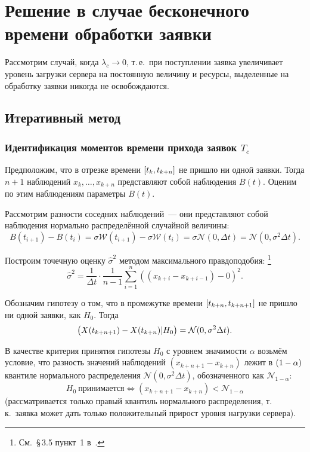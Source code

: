 \documentclass[a4paper,10pt]{article}
\begin{document}
\section{Решение в случае бесконечного времени обработки заявки}
Рассмотрим случай, когда $\lambda_c \rightarrow 0$, 
т.\,е.~при поступлении заявка увеличивает уровень загрузки 
сервера на постоянную величину и ресурсы, выделенные на обработку заявки
никогда не освобождаются.

\subsection{Итеративный метод}
\subsubsection{Идентификация моментов времени прихода заявок $T_c$}%
\label{lc0-iter-Tc}
Предположим, что в отрезке времени $\sbr{t_k, t_{k+n}}$ 
не пришло ни одной заявки.
Тогда $n + 1$ наблюдений $x_k,\ldots,x_{k+n}$ представляют собой наблюдения
$B(t)$.
Оценим по этим наблюдениям параметры $B(t)$.

Рассмотрим разности соседних наблюдений~--- они представляют собой наблюдения 
нормально распределённой случайной величины:
$$B(t_{i+1}) - B(t_i) = 
    \sigma \mathcal{W}(t_{i+1}) - \sigma \mathcal{W}(t_i) = 
    \sigma \mathcal{N}(0, \Delta t) = 
    \mathcal{N}(0, \sigma^2 \Delta t).$$

Построим точечную оценку $\widehat{\sigma}^2$ 
методом максимального правдоподобия:%
\footnote{См.~\S\,3.5 пункт~1 в~\cite{ivchmed2010matstat}.}
%
$$\widehat{\sigma}^2 = 
    \frac{1}{\Delta t}\cdot\frac{1}{n-1}
        \sum\limits_{i=1}^n ((x_{k+i} - x_{k+i-1}) - 0)^2.$$

Обозначим гипотезу о том, что в промежутке времени 
$\sbr{t_{k+n}, t_{k+n+1}}$ не пришло ни одной заявки, 
как $H_0$.
Тогда 
$$\del{X(t_{k+n+1})-X(t_{k+n}) \vert H_0} = 
    \mathcal{N}(0, \sigma^2 \Delta t).$$

В качестве критерия принятия гипотезы $H_0$ с уровнем значимости 
$\alpha$ 
возьмём условие, что разность значений наблюдений $(x_{k+n+1}-x_{k+n})$
лежит в $\del{1 - \alpha}$ квантиле
нормального распределения $\mathcal{N}(0, \sigma^2 \Delta t)$,
обозначенного как $\mathcal{N}_{1 - \alpha}$:
$$
H_0 \  \mathrm{\text{принимается}} \iff
        (x_{k+n+1}-x_{k+n}) < 
	    \mathcal{N}_{1 - \alpha}
$$
(рассматривается только правый квантиль нормального распределения, 
т.\,к.~заявка может дать только положительный прирост уровня нагрузки 
сервера).
\end{document}
